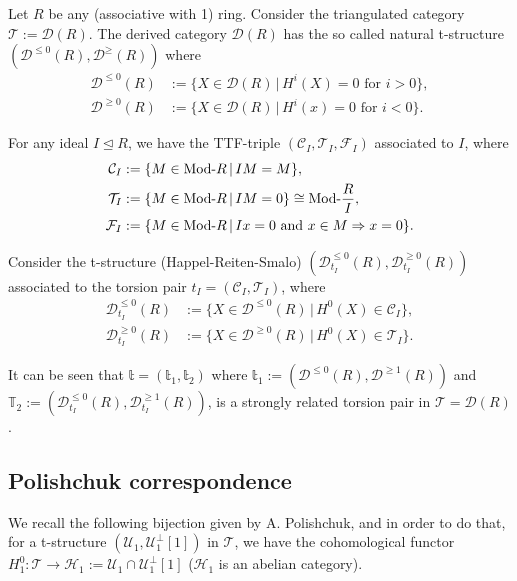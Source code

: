 \begin{example}
  Let $R$ be any (associative with 1) ring. Consider the triangulated category $\mathcal{T}:=\mathcal{D}(R)$.
  The derived category $\mathcal{D}(R)$ has the so called natural t-structure
  $(\mathcal{D}^{\leq 0}(R),\mathcal{D}^{\geq}(R))$ where
  \begin{align*}
    \mathcal{D}^{\leq 0}(R) &:= \{ X\in\mathcal{D}(R) \,|\,H^i(X)=0\text{ for } i>0\},\\
    \mathcal{D}^{\geq 0}(R) &:= \{ X\in\mathcal{D}(R) \,|\,H^i(x)=0\text{ for } i<0\}.
  \end{align*}

  For any ideal $I\trianglelefteq R$, we have the TTF-triple $(\mathcal{C}_I,\mathcal{T}_I,\mathcal{F}_I)$
  associated to $I$, where
  \begin{align*}
    \mathcal{C}_I &:= \{M\in\mathrm{\textup{Mod-}}R\,|\,IM=M\},\\
    \mathcal{T}_I &:= \{M\in\mathrm{\textup{Mod-}}R\,|\,IM=0\}\cong \mathrm{\textup{Mod-}}\frac{R}{I},\\
    \mathcal{F}_I &:= \{M\in\mathrm{\textup{Mod-}}R\,|\,Ix=0\text{ and }x\in M\Rightarrow x=0\}.
  \end{align*}

  Consider the t-structure (Happel-Reiten-Smalo) $(\mathcal{D}^{\leq 0}_{t_I}(R), \mathcal{D}^{\geq 0}_{t_I}(R))$
  associated to the torsion pair $t_I=(\mathcal{C}_I,\mathcal{T}_I)$, where
  \begin{align*}
    \mathcal{D}^{\leq 0}_{t_I}(R) &:= \{ X\in\mathcal{D}^{\leq 0}(R)\,|\, H^0(X)\in\mathcal{C}_I \},\\
    \mathcal{D}^{\geq 0}_{t_I}(R) &:= \{ X\in\mathcal{D}^{\geq 0}(R)\,|\, H^0(X)\in\mathcal{T}_I \}.
  \end{align*}

  It can be seen that $\mathbb{t}=(\mathbb{t}_1,\mathbb{t}_2)$ where
  $\mathbb{t}_1:=(\mathcal{D}^{\leq 0}(R),\mathcal{D}^{\geq 1}(R))$ and
  $\mathbb{T}_2:=(\mathcal{D}^{\leq 0}_{t_I}(R),\mathcal{D}^{\geq 1}_{t_I}(R))$, is a strongly
  related torsion pair in $\mathcal{T}=\mathcal{D}(R)$.
\end{example}

\subsection{Polishchuk correspondence}

We recall the following bijection given by A. Polishchuk, and in order to do that,
for a t-structure $(\mathcal{U}_1,\mathcal{U}_1^\perp[1])$ in $\mathcal{T}$, we have the cohomological
functor $H^0_1:\mathcal{T}\to \mathcal{H}_1:=\mathcal{U}_1\cap\mathcal{U}_1^\perp[1]$
($\mathcal{H}_1$ is an abelian category).

